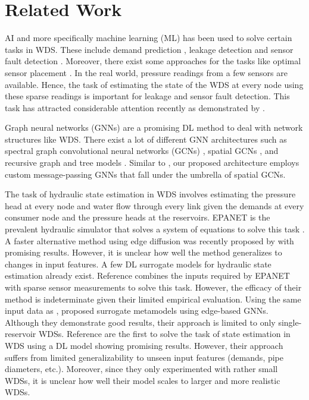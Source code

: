 \section{Related Work}
AI and more specifically machine learning (ML) has been used to solve certain tasks in WDS. These include demand prediction \cite{WU2023104545}, leakage detection \cite{Fan2021, valerie_icpram24} and sensor fault detection \cite{valerie_sensor}. Moreover, there exist some approaches for the tasks like optimal sensor placement \cite{Candelieri_2022, su15042981}. In the real world, pressure readings from a few sensors are available. Hence, the task of estimating the state of the WDS at every node using these sparse readings is important for leakage and sensor fault detection. This task has attracted considerable attention recently as demonstrated by \cite{su15042981, ashraf2023spatial, hajgato2021pressure, Truong_2024, xing2022stateestimation}.

Graph neural networks (GNNs) are a promising DL method to deal with network structures like WDS. There exist a lot of different GNN architectures such as spectral graph convolutional neural networks (GCNs) \cite{Bruna2014SpectralNA,kipf2017semi,defferrard2016convolutional,henaff2015deep,levie2018cayleynets,li2018adaptive}, spatial GCNs \cite{hamilton2017inductive,monti2017geometric,gao2018large,niepert2016learning,xu2018powerful,velickovic2018graph}, and recursive graph and tree models  \cite{scarselli2009, diss}. Similar to \cite{Ashraf_Strotherm_Hermes_Hammer_2024}, our proposed architecture employs custom message-passing GNNs that fall under the umbrella of spatial GCNs. 

The task of hydraulic state estimation in WDS involves estimating the pressure head at every node and water flow through every link given the demands at every consumer node and the pressure heads at the reservoirs. EPANET is the prevalent hydraulic simulator that solves a system of equations to solve this task \cite{rossman2020epanet}. A faster alternative method using edge diffusion was recently proposed by \cite{KERIMOV2025122980} with promising results. However, it is unclear how well the method generalizes to changes in input features. A few DL surrogate models for hydraulic state estimation already exist. Reference \cite{xing2022stateestimation} combines the inputs required by EPANET with sparse sensor measurements to solve this task. However, the efficacy of their method is indeterminate given their limited empirical evaluation. Using the same input data as \cite{xing2022stateestimation}, \cite{KERIMOV2024121933} proposed surrogate metamodels using edge-based GNNs. Although they demonstrate good results, their approach is limited to only single-reservoir WDSs. Reference \cite{Ashraf_Strotherm_Hermes_Hammer_2024} are the first to solve the task of state estimation in WDS using a DL model showing promising results. However, their approach suffers from limited generalizability to unseen input features (demands, pipe diameters, etc.). Moreover, since they only experimented with rather small WDSs, it is unclear how well their model scales to larger and more realistic WDSs. 

